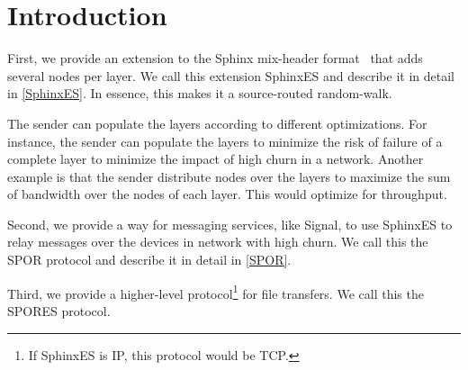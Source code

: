 
\section{Introduction}


First, we provide an extension to the Sphinx mix-header format~\cite{Sphinx} 
that adds several nodes per layer.
We call this extension SphinxES and describe it in detail in \cref{SphinxES}.
In essence, this makes it a source-routed random-walk.

The sender can populate the layers according to different optimizations.
For instance, the sender can populate the layers to minimize the risk of 
failure of a complete layer to minimize the impact of high churn in a 
network.
Another example is that the sender distribute nodes over the layers to maximize 
the sum of bandwidth over the nodes of each layer.
This would optimize for throughput.

Second, we provide a way for messaging services, like Signal, to use SphinxES 
to relay messages over the devices in  network with high churn.
We call this the \ac{SPOR} protocol and describe it in detail in \cref{SPOR}.

Third, we provide a higher-level protocol\footnote{%
  If SphinxES is IP, this protocol would be TCP.
} for file transfers.
We call this the \ac{SPORES} protocol.

\endinput

